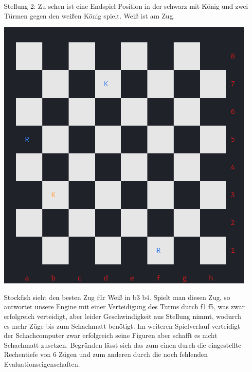 \documentclass[a4paper, 12pt]{article}
\begin{document}
Stellung 2:
Zu sehen ist eine Endspiel Position in der schwarz mit König und zwei Türmen gegen den weißen König spielt. Weiß ist am Zug.
\begin{center}
\includegraphics[scale=0.63]{images/st_1_1.png}
\label{ncurses_board}
\end{center}
Stockfish sieht den besten Zug für Weiß in b3 b4. Spielt man diesen Zug, so antwortet unsere Engine mit einer Verteidigung des Turms durch f1 f5, was zwar erfolgreich verteidigt, aber leider Geschwindigkeit aus Stellung nimmt, wodurch es mehr Züge bis zum Schachmatt benötigt.
Im weiteren Spielverlauf verteidigt der Schachcomputer zwar erfolgreich seine Figuren aber schafft es nicht Schachmatt zusetzen.
Begründen lässt sich das zum einen durch die eingestellte Rechentiefe von 6 Zügen und zum anderen durch die noch fehlenden Evaluationseigenschaften.
\end{document}
